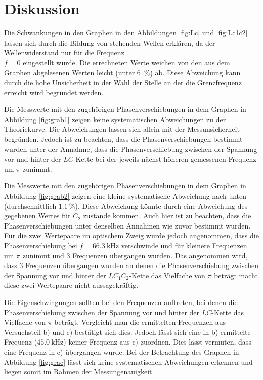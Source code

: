 
\section{Diskussion}
\label{sec:Diskussion}

Die Schwankungen in den Graphen in den Abbildungen \ref{fig:Lc} und \ref{fig:Lc1c2} lassen sich durch die Bildung von stehenden Wellen erklären, da der Wellenwiderstand nur für die Frequenz \\$f=0$ eingestellt wurde. Die errechneten Werte weichen von den aus dem Graphen abgelesenen Werten leicht (unter \SI{6}{\percent}) ab. Diese Abweichung kann durch die hohe Unsicherheit in der Wahl der Stelle an der die Grenzfrequenz erreicht wird begründet werden. 

Die Messwerte mit den zugehörigen Phasenverschiebungen in dem Graphen in Abbildung \ref{fig:grab1} zeigen keine systematischen Abweichungen zu der Theoriekurve. Die Abweichungen lassen sich allein mit der Messunsicherheit begründen. Jedoch ist zu beachten, dass die Phasenverschiebungen bestimmt wurden unter der Annahme, dass die Phasenverschiebung zwischen der Spannung vor und hinter der $LC$-Kette bei der jeweils nächst höheren gemessenen Frequenz um $\pi$ zunimmt.

Die Messwerte mit den zugehörigen Phasenverschiebungen in dem Graphen in Abbildung \ref{fig:grab2} zeigen eine kleine systematische Abweichung nach unten (durchschnittlich $\SI{1.1}{\percent}$). Diese Abweichung könnte durch eine Abweichung des gegebenen Wertes für $C_2$ zustande kommen. Auch hier ist zu beachten, dass die Phasenverschiebungen unter denselben Annahmen wie zuvor bestimmt wurden. Für die zwei Wertepaare im optischem Zweig wurde jedoch angenommen, dass die Phasenverschiebung bei $f=\SI{66.3}{\kilo\hertz}$ verschwinde und für kleinere Frequenzen um $\pi$ zunimmt und 3 Frequenzen übergangen wurden. Das angenommen wird, dass 3 Frequenzen übergangen wurden an denen die Phasenverschiebung zwischen der Spannung vor und hinter der $LC_1C_2$-Kette das Vielfache von $\pi$ beträgt macht diese zwei Wertepaare nicht aussagekräftig.

Die Eigenschwingungen sollten bei den Frequenzen auftreten, bei denen die Phasenverschiebung zwischen der Spannung vor und hinter der $LC$-Kette das Vielfache von $\pi$ beträgt. Vergleicht man die ermittelten Frequenzen aus Versuchsteil b) und c) bestätigt sich dies. Jedoch lässt sich eine in b) ermittelte Frequenz ($\SI{45.0}{\kilo\hertz}$) keiner Frequenz aus c) zuordnen. Dies lässt vermuten, dass eine Frequenz in c) übergangen wurde.
Bei der Betrachtung des Graphen in Abbildung \ref{fig:grac} lässt sich keine systematischen Abweichungen erkennen und liegen somit im Rahmen der Messungenauigkeit.

